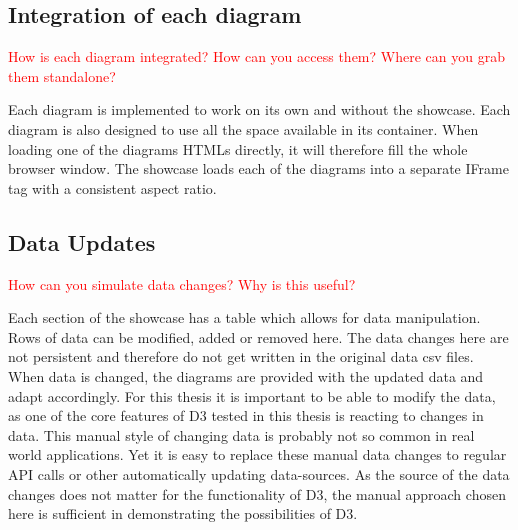 \subsection{Integration of each diagram}
\textcolor{red}{
How is each diagram integrated? How can you access them? Where can you grab them standalone?}

Each diagram is implemented to work on its own and without the showcase. Each diagram is also designed to use all the space available in its container. When loading one of the diagrams HTMLs directly, it will therefore fill the whole browser window. The showcase loads each of the diagrams into a separate IFrame tag with a consistent aspect ratio.

\subsection{Data Updates}
\textcolor{red}{
How can you simulate data changes? Why is this useful?}

Each section of the showcase has a table which allows for data manipulation. Rows of data can be modified, added or removed here. The data changes here are not persistent and therefore do not get written in the original data csv files. When data is changed, the diagrams are provided with the updated data and adapt accordingly. For this thesis it is important to be able to modify the data, as one of the core features of D3 tested in this thesis is reacting to changes in data. This manual style of changing data is probably not so common in real world applications. Yet it is easy to replace these manual data changes to regular API calls or other automatically updating data-sources. As the source of the data changes does not matter for the functionality of D3, the manual approach chosen here is sufficient in demonstrating the possibilities of D3.
